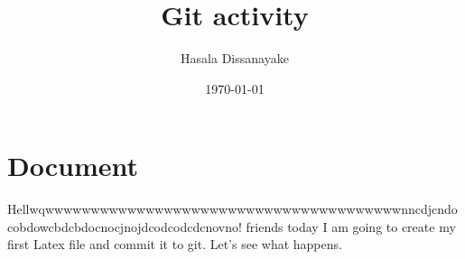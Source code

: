 \documentclass[a4 paper]{article}
\title{Git activity}
\author{Hasala Dissanayake}
\date{\today}
\begin{document}
\maketitle
\section{Document}

Hellwqwwwwwwwwwwwwwwwwwwwwwwwwwwwwwwwwwwwwwwwnncdjcndocobdowcbdcbdocnocjnojdcodcodcdcnovno! friends today I am going to create my first Latex file and commit it to git. Let's see what happens.
\end{document}
